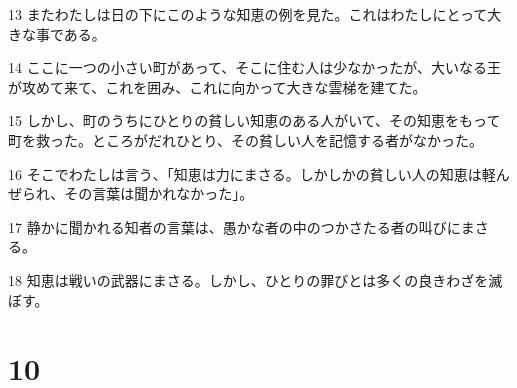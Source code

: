 \par 13 またわたしは日の下にこのような知恵の例を見た。これはわたしにとって大きな事である。
\par 14 ここに一つの小さい町があって、そこに住む人は少なかったが、大いなる王が攻めて来て、これを囲み、これに向かって大きな雲梯を建てた。
\par 15 しかし、町のうちにひとりの貧しい知恵のある人がいて、その知恵をもって町を救った。ところがだれひとり、その貧しい人を記憶する者がなかった。
\par 16 そこでわたしは言う、「知恵は力にまさる。しかしかの貧しい人の知恵は軽んぜられ、その言葉は聞かれなかった」。
\par 17 静かに聞かれる知者の言葉は、愚かな者の中のつかさたる者の叫びにまさる。
\par 18 知恵は戦いの武器にまさる。しかし、ひとりの罪びとは多くの良きわざを滅ぼす。

\chapter{10}

